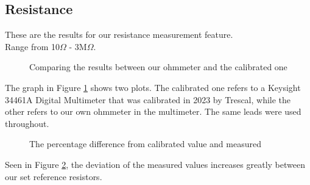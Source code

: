 \subsection{Resistance}
\label{sec:results_resistance}
These are the results for our resistance measurement feature. \\ Range from 10$\Omega$ - 3M$\Omega$.
\begin{figure}[h]
    \centering
    \caption{Comparing the results between our ohmmeter and the calibrated one}
    \label{fig:resGraph}
\end{figure}

\noindent The graph in Figure \ref{fig:resGraph} shows two plots. The calibrated one refers to a Keysight 34461A Digital Multimeter that was calibrated in 2023 by Trescal, while the other refers to our own ohmmeter in the multimeter. The same leads were used throughout.

\begin{figure}[h]
    \centering
    \caption{The percentage difference from calibrated value and measured}
    \label{fig:resGraphDiff}
\end{figure}

\noindent Seen in Figure \ref{fig:resGraphDiff}, the deviation of the measured values increases greatly between our set reference resistors.
\FloatBarrier
